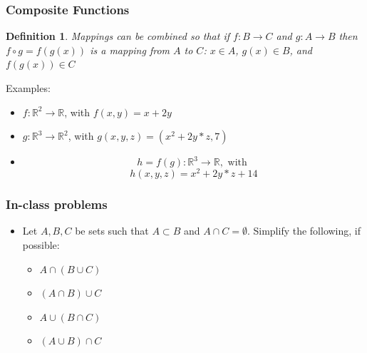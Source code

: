 \documentclass{beamer}
\newtheorem{defn}{Definition}
\numberwithin{equation}{section}
\begin{document}
\begin{frame}
\frametitle{Composite Functions}

\begin{defn}
Mappings can be combined so that if $f:B\rightarrow C$ and $g: A\rightarrow B$ then $f\circ g = f(g(x))$ is a mapping from $A$ to $C$: $x\in A$, $g(x)\in B$, and $f(g(x))\in C$
\end{defn}
\pause

{Examples: } 
\begin{itemize}
\item $f: \mathbb{R}^2\rightarrow \mathbb{R}$, with $f(x, y)=x+2y$ \pause
\end{itemize}

\begin{itemize}
\item $g: \mathbb{R}^3\rightarrow \mathbb{R}^2$, with $g(x, y, z)=(x^2+2y*z, 7)$ \pause
\end{itemize}

\begin{itemize}
\item $$h=f(g): \mathbb{R}^3\rightarrow\mathbb{R}, \text{ with }$$
$$h(x, y, z)=x^2+2y*z+14$$
\end{itemize}

\end{frame}



\begin{frame}
\frametitle{In-class problems}

\begin{itemize}

\item[3.1.2] Let $A, B, C$ be sets such that $A\subset B$ and $A\cap C=\emptyset$.  Simplify the following, if possible:

\begin{itemize}
\item $A\cap(B\cup C)$ %
\item $(A\cap B)\cup C$ %
\item $A\cup(B\cap C)$ %
\item $(A\cup B)\cap C$ %


\end{itemize}

\end{itemize}
\end{frame}
\end{document}
